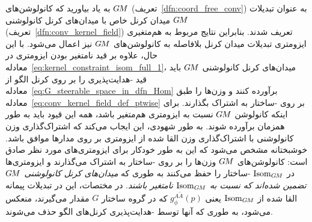 به یاد بیاورید که کانولوشن‌های $G\mkern-1.4muM$ (تعریف~\ref{dfn:coord_free_conv}) به عنوان تبدیلات میدان کرنل خاص با میدان‌های کرنل کانولوشنی $G\mkern-1.4muM$ (تعریف~\ref{dfn:conv_kernel_field}) تعریف شدند.
بنابراین نتایج مربوط به هم‌متغیری ایزومتری تبدیلات میدان کرنل بلافاصله به کانولوشن‌های $G\mkern-1.4muM$ نیز اعمال می‌شود.
با این حال، علاوه بر قید نامتغیر بودن ایزومتری در معادله~\eqref{eq:kernel_constraint_isom_full_1}، میدان‌های کرنل کانولوشنی $G\mkern-1.4muM$ باید قید -هدایت‌پذیری را بر روی کرنل الگو از معادله~\eqref{eq:G_steerable_space_in_dfn_Hom} برآورده کنند و وزن‌ها را طبق معادله~\eqref{eq:conv_kernel_field_def_ptwise} بر روی -ساختار به اشتراک بگذارند.
برای اینکه کانولوشن $G\mkern-1.4muM$ نسبت به ایزومتری هم‌متغیر باشد، همه این قیود باید به طور همزمان برآورده شوند.
به طور شهودی، این ایجاب می‌کند که اشتراک‌گذاری وزن کانولوشنی با اشتراک‌گذاری وزن القا شده از ایزومتری بر روی مدارها موافق باشد.
خوشبختانه مشخص می‌شود که این به طور خودکار برای ایزومتری‌های مورد نظر صادق است:
کانولوشن‌های $G\mkern-1.4muM$ وزن‌ها را بر روی -ساختار به اشتراک می‌گذارند و ایزومتری‌ها در $\operatorname{Isom}_{G\mkern-1.4muM}$ -ساختار را حفظ می‌کنند به طوری که \emph{میدان‌های کرنل کانولوشنی $G\mkern-1.4muM$ تضمین شده‌اند که نسبت به $\operatorname{Isom}_{G\mkern-1.4muM}$ نامتغیر باشند}.
در مختصات، این در تبدیلات پیمانه القا شده از $\operatorname{Isom}_{G\mkern-1.4muM}$ یعنی $g_\phi^{A\widetilde{A}}(p)$ که در گروه ساختار $G$ مقدار می‌گیرند، منعکس می‌شود، به طوری که آنها توسط -هدایت‌پذیری کرنل‌های الگو حذف می‌شوند.


